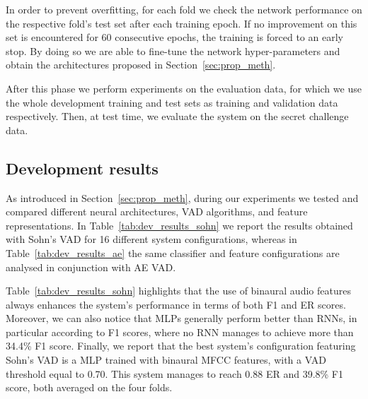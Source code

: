 In order to prevent overfitting, for each fold we check the network performance on the respective fold's test set after each training epoch. If no improvement on this set is encountered for 60 consecutive epochs, the training is forced to an early stop. By doing so we are able to fine-tune the network hyper-parameters and obtain the architectures proposed in Section~\ref{sec:prop_meth}. 

After this phase we perform experiments on the evaluation data, for which we use the whole development training and test sets as training and validation data respectively. Then, at test time, we evaluate the system on the secret challenge data.

\subsection{Development results}

As introduced in Section~\ref{sec:prop_meth}, during our experiments we tested and compared different neural architectures, VAD algorithms, and feature representations. In Table~\ref{tab:dev_results_sohn} we report the results obtained with Sohn's VAD for 16 different system configurations, whereas in Table~\ref{tab:dev_results_ae} the same classifier and feature configurations are analysed in conjunction with AE VAD.

Table~\ref{tab:dev_results_sohn} highlights that the use of binaural audio features always enhances the system's performance in terms of both F1 and ER scores. Moreover, we can also notice that MLPs generally perform better than RNNs, in particular according to F1 scores, where no RNN manages to achieve more than 34.4\% F1 score. Finally, we report that the best system's configuration featuring Sohn's VAD is a MLP trained with binaural MFCC features, with a VAD threshold equal to 0.70. This system manages to reach 0.88 ER and 39.8\% F1 score, both averaged on the four folds.

